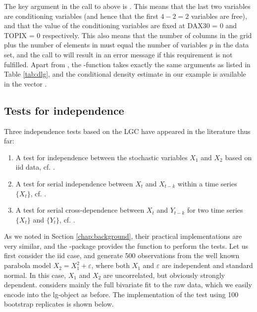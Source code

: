 The key argument in the call to  above is . This means that the last two variables are conditioning variables (and hence that the first \(4-2=2\) variables are free), and that the value of the conditioning variables are fixed at DAX30 = 0 and TOPIX = 0 respectively. This also means that the number of columns in the grid  plus the number of elements in  must equal the number of variables \(p\) in the data set, and the call to  will result in an error message if this requirement is not fulfilled. Apart from , the -function takes exactly the same arguments as  listed in Table \ref{tab:dlg}, and the conditional density estimate in our example is available in the vector .

\subsection{Tests for independence}
\label{chap:indtests}

Three independence tests based on the LGC have appeared in the literature thus far:

\begin{enumerate}
\def\labelenumi{\arabic{enumi}.}
\item
  A test for independence between the stochastic variables \(X_1\) and \(X_2\) based on iid data, cf. \citet{bere:tjos:2014}.
\item
  A test for serial independence between \(X_t\) and \(X_{t-k}\) within a time series \(\{X_t\}\), cf. \citet{laca:tjos:2017}. 
\item
  A test for serial cross-dependence between \(X_t\) and \(Y_{t-k}\) for two time series \(\{X_t\}\) and \(\{Y_t\}\), cf. \citet{laca:tjos:2018}.
\end{enumerate}
As we noted in Section \ref{chap:background}, their practical implementations are very similar, and the -package provides the function  to perform the tests. Let us first consider the iid case, and generate 500 observations  from the well known parabola model \(X_2 = X_1^2 + \varepsilon\), where both \(X_1\) and \(\varepsilon\) are independent and standard normal. In this case, \(X_1\) and \(X_2\) are uncorrelated, but obviously strongly dependent. \citet{bere:tjos:2014} considers mainly the full bivariate fit to the raw data, which we easily encode into the lg-object as before. The implementation of the test using 100 bootstrap replicates is shown below.

